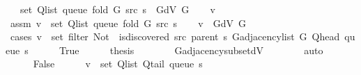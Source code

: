 \begin{isabellebody}
\ \ \ {\isachardoublequoteopen}set\ {\isacharparenleft}{\kern0pt}Q{\isacharunderscore}{\kern0pt}list\ {\isacharparenleft}{\kern0pt}queue\ {\isacharparenleft}{\kern0pt}fold\ G\ src\ s{\isacharparenright}{\kern0pt}{\isacharparenright}{\kern0pt}{\isacharparenright}{\kern0pt}\ {\isasymsubseteq}\ G{\isachardot}{\kern0pt}dV\ G{\isachardoublequoteclose}%
\endisataginvisible
{\isafoldinvisible}%
%
\isadeliminvisible
\isanewline
%
\endisadeliminvisible
%
\isadelimproof
%
\endisadelimproof
%
\isatagproof
{}\isamarkupfalse%
\isanewline
\ \ \isamarkupfalse%
\ v\isanewline
\ \ \isamarkupfalse%
\ assm{\isacharcolon}{\kern0pt}\ {\isachardoublequoteopen}v\ {\isasymin}\ set\ {\isacharparenleft}{\kern0pt}Q{\isacharunderscore}{\kern0pt}list\ {\isacharparenleft}{\kern0pt}queue\ {\isacharparenleft}{\kern0pt}fold\ G\ src\ s{\isacharparenright}{\kern0pt}{\isacharparenright}{\kern0pt}{\isacharparenright}{\kern0pt}{\isachardoublequoteclose}\isanewline
\ \ \isamarkupfalse%
\ {\isachardoublequoteopen}v\ {\isasymin}\ G{\isachardot}{\kern0pt}dV\ G{\isachardoublequoteclose}\isanewline
\ \ \isamarkupfalse%
\ {\isacharparenleft}{\kern0pt}cases\ {\isachardoublequoteopen}v\ {\isasymin}\ set\ {\isacharparenleft}{\kern0pt}filter\ {\isacharparenleft}{\kern0pt}Not\ {\isasymcirc}\ is{\isacharunderscore}{\kern0pt}discovered\ src\ {\isacharparenleft}{\kern0pt}parent\ s{\isacharparenright}{\kern0pt}{\isacharparenright}{\kern0pt}\ {\isacharparenleft}{\kern0pt}G{\isachardot}{\kern0pt}adjacency{\isacharunderscore}{\kern0pt}list\ G\ {\isacharparenleft}{\kern0pt}Q{\isacharunderscore}{\kern0pt}head\ {\isacharparenleft}{\kern0pt}queue\ s{\isacharparenright}{\kern0pt}{\isacharparenright}{\kern0pt}{\isacharparenright}{\kern0pt}{\isacharparenright}{\kern0pt}{\isachardoublequoteclose}{\isacharparenright}{\kern0pt}\isanewline
\ \ \ \ \isamarkupfalse%
\ True\isanewline
\ \ \ \ \isamarkupfalse%
\ {\isacharquery}{\kern0pt}thesis\isanewline
\ \ \ \ \ \ \isamarkupfalse%
\ G{\isachardot}{\kern0pt}adjacency{\isacharunderscore}{\kern0pt}subset{\isacharunderscore}{\kern0pt}dV\isanewline
\ \ \ \ \ \ \isamarkupfalse%
\ auto\isanewline
\ \ \isamarkupfalse%
\isanewline
\ \ \ \ \isamarkupfalse%
\ False\isanewline
\ \ \ \ \isamarkupfalse%
\ {\isachardoublequoteopen}v\ {\isasymin}\ set\ {\isacharparenleft}{\kern0pt}Q{\isacharunderscore}{\kern0pt}list\ {\isacharparenleft}{\kern0pt}Q{\isacharunderscore}{\kern0pt}tail\ {\isacharparenleft}{\kern0pt}queue\ s{\isacharparenright}{\kern0pt}{\isacharparenright}{\kern0pt}{\isacharparenright}{\kern0pt}{\isachardoublequoteclose}\isanewline

\end{isabellebody}
